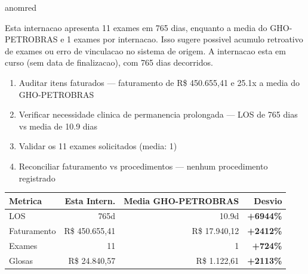 \documentclass[a4paper,10pt]{article}
\begin{document}
\begin{anomalycard}[Internacao 80769 | GHO-PETROBRAS | CRITICO (z=5.01)]{anomred}
\vspace{2pt}\begin{tcolorbox}[colback=severityred!20,colframe=anomred,title={\textbf{Interpretacao de Negocio}},fonttitle=\bfseries\small,left=4pt,right=4pt,top=3pt,bottom=3pt]
{\small Esta internacao apresenta 11 exames em 765 dias, enquanto a media do GHO-PETROBRAS e 1 exames por internacao. Isso sugere possivel acumulo retroativo de exames ou erro de vinculacao no sistema de origem. A internacao esta em curso (sem data de finalizacao), com 765 dias decorridos.}
\end{tcolorbox}
\begin{tcolorbox}[colback=severityyellow!30,colframe=anomorange,title={\textbf{Recomendacoes Especificas}},fonttitle=\bfseries\small,left=4pt,right=4pt,top=3pt,bottom=3pt]
\begin{enumerate}[nosep,leftmargin=16pt]
\item {\small Auditar itens faturados --- faturamento de R\$ 450.655,41 e 25.1x a media do GHO-PETROBRAS}
\item {\small Verificar necessidade clinica de permanencia prolongada --- LOS de 765 dias vs media de 10.9 dias}
\item {\small Validar os 11 exames solicitados (media: 1)}
\item {\small Reconciliar faturamento vs procedimentos --- nenhum procedimento registrado}
\end{enumerate}
\end{tcolorbox}
\begin{center}\begin{tabular}{l r r r}\toprule\textbf{Metrica} & \textbf{Esta Intern.} & \textbf{Media GHO-PETROBRAS} & \textbf{Desvio} \\\midrule
LOS & 765d & 10.9d & \textcolor{anomred}{\textbf{+6944\%}} \\
Faturamento & R\$ 450.655,41 & R\$ 17.940,12 & \textcolor{anomred}{\textbf{+2412\%}} \\
Exames & 11 & 1 & \textcolor{anomred}{\textbf{+724\%}} \\
Glosas & R\$ 24.840,57 & R\$ 1.122,61 & \textcolor{anomred}{\textbf{+2113\%}} \\
\bottomrule\end{tabular}\end{center}


\end{anomalycard}
\end{document}
